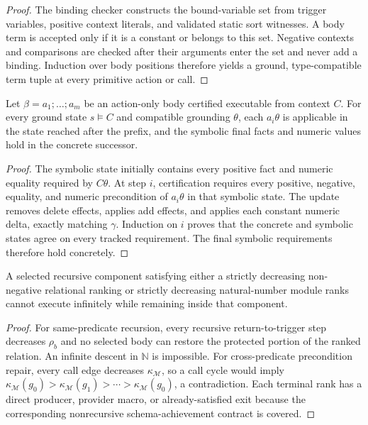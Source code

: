 \begin{proof}
The binding checker constructs the bound-variable set from trigger variables,
positive context literals, and validated static sort witnesses. A body term is
accepted only if it is a constant or belongs to this set. Negative contexts and
comparisons are checked after their arguments enter the set and never add a
binding. Induction over body positions therefore yields a ground, type-compatible
term tuple at every primitive action or call.
\end{proof}

\begin{lemma}
Let $\beta=a_1;\ldots;a_m$ be an action-only body certified executable from
context $C$. For every ground state $s\models C$ and compatible grounding
$\theta$, each $a_i\theta$ is applicable in the state reached after the prefix,
and the symbolic final facts and numeric values hold in the concrete successor.
\end{lemma}

\begin{proof}
The symbolic state initially contains every positive fact and numeric equality
required by $C\theta$. At step $i$, certification requires every positive,
negative, equality, and numeric precondition of $a_i\theta$ in that symbolic
state. The update removes delete effects, applies add effects, and applies each
constant numeric delta, exactly matching $\gamma$. Induction on $i$ proves that
the concrete and symbolic states agree on every tracked requirement. The final
symbolic requirements therefore hold concretely.
\end{proof}

\begin{lemma}
A selected recursive component satisfying either a strictly decreasing
non-negative relational ranking or strictly decreasing natural-number module
ranks cannot execute infinitely while remaining inside that component.
\end{lemma}

\begin{proof}
For same-predicate recursion, every recursive return-to-trigger step decreases
$\rho_b$ and no selected body can restore the protected portion of
the ranked relation. An infinite descent in $\mathbb N$ is impossible. For
cross-predicate precondition repair, every call edge decreases
$\kappa_{\mathcal M}$, so a
call cycle would imply
$\kappa_{\mathcal M}(g_0)>\kappa_{\mathcal M}(g_1)>\cdots>
\kappa_{\mathcal M}(g_0)$, a contradiction. Each
terminal rank has a direct producer, provider macro, or already-satisfied exit
because the corresponding nonrecursive schema-achievement contract is covered.
\end{proof}


